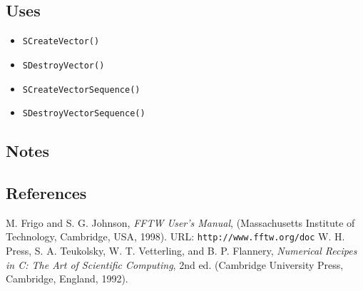 \documentclass{article}
\begin{document}
\subsection{Uses}


\begin{itemize}
\item\texttt{SCreateVector()}
\item\texttt{SDestroyVector()}
\item\texttt{SCreateVectorSequence()}
\item\texttt{SDestroyVectorSequence()}
\end{itemize}

\subsection{Notes}

\subsection{References}

\begin{thebibliography}{0}
  M. Frigo and S. G. Johnson,
  \textit{FFTW User's Manual},
  (Massachusetts Institute of Technology, Cambridge, USA, 1998).
  URL: \texttt{http://www.fftw.org/doc}
  W. H. Press, S. A. Teukolsky, W. T. Vetterling, and B. P. Flannery,
  \textit{Numerical Recipes in C: The Art of Scientific Computing}, 2nd ed.
  (Cambridge University Press, Cambridge, England, 1992).
\end{thebibliography}
\end{document}
